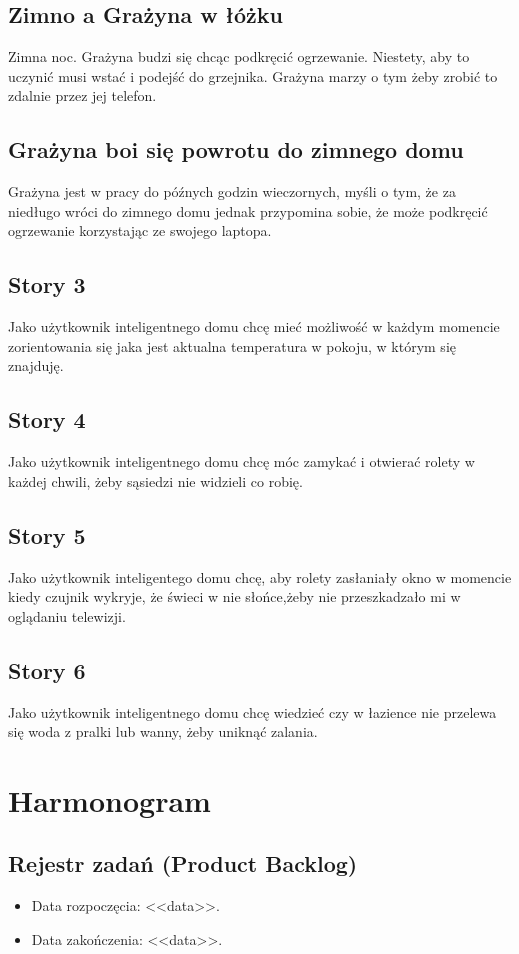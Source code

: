 	\subsection{Zimno a Grażyna w łóżku}
	 Zimna noc. Grażyna budzi się chcąc podkręcić ogrzewanie. Niestety, aby to uczynić musi wstać i podejść do grzejnika. Grażyna marzy o tym żeby zrobić to zdalnie przez jej telefon.
	
	\subsection{Grażyna boi się powrotu do zimnego domu}
	Grażyna jest w pracy do późnych godzin wieczornych, myśli o tym, że za niedługo wróci do zimnego domu jednak przypomina sobie, że może podkręcić ogrzewanie korzystając ze swojego laptopa.
	
	\subsection{Story 3}
	Jako użytkownik inteligentnego domu chcę mieć możliwość w każdym momencie zorientowania się jaka jest aktualna temperatura w pokoju, w którym się znajduję.
	
	\subsection{Story 4}
	Jako użytkownik inteligentnego domu chcę móc zamykać i otwierać rolety w każdej chwili, żeby sąsiedzi nie widzieli co robię.
	
	\subsection{Story 5} 
	Jako użytkownik inteligentego domu chcę, aby rolety zasłaniały okno w momencie kiedy czujnik wykryje, że świeci w nie słońce,żeby nie przeszkadzało mi w oglądaniu telewizji.
	
	\subsection{Story 6}
	Jako użytkownik inteligentnego domu chcę wiedzieć czy w łazience nie przelewa się woda z pralki lub wanny, żeby uniknąć zalania. 
	
	
	
	\section{Harmonogram}
	
	\subsection{Rejestr zadań (Product Backlog)}
	
	\begin{itemize}
		\item Data rozpoczęcia: <<data>>.
		\item  Data zakończenia: <<data>>.
	\end{itemize}